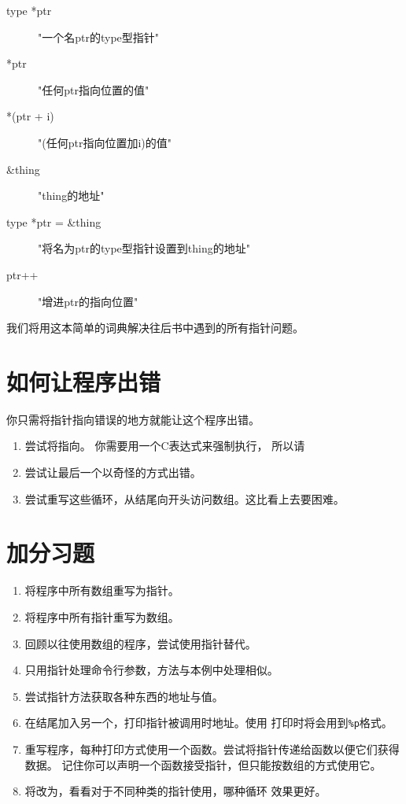 \begin{description}
\item[type *ptr] "一个名ptr的type型指针"
\item[*ptr] "任何ptr指向位置的值"
\item[*(ptr + i)] "(任何ptr指向位置加i)的值"
\item[\&thing] "thing的地址"
\item[type *ptr = \&thing] "将名为ptr的type型指针设置到thing的地址"
\item[ptr++] "增进ptr的指向位置"
\end{description}

我们将用这本简单的词典解决往后书中遇到的所有指针问题。

\section{如何让程序出错}

你只需将指针指向错误的地方就能让这个程序出错。

\begin{enumerate}
\item 尝试将指向。 你需要用一个C表达式来强制执行，
	所以请
\item 尝试让最后一个以奇怪的方式出错。
\item 尝试重写这些循环，从结尾向开头访问数组。这比看上去要困难。
\end{enumerate}

\section{加分习题}

\begin{enumerate}
\item 将程序中所有数组重写为指针。
\item 将程序中所有指针重写为数组。
\item 回顾以往使用数组的程序，尝试使用指针替代。
\item 只用指针处理命令行参数，方法与本例中处理相似。
\item 尝试指针方法获取各种东西的地址与值。
\item 在结尾加入另一个，打印指针被调用时地址。使用
	打印时将会用到\verb|%p|格式。
\item 重写程序，每种打印方式使用一个函数。尝试将指针传递给函数以便它们获得数据。
	记住你可以声明一个函数接受指针，但只能按数组的方式使用它。
\item 将改为，看看对于不同种类的指针使用，哪种循环
	效果更好。
\end{enumerate}


